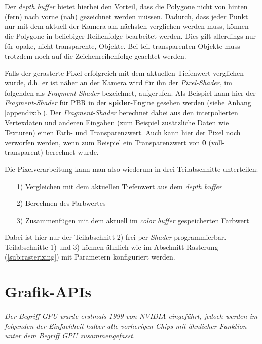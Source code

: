 \documentclass[oneside]{ausarbeitung}
\newcommand*{\quotize}[1]{\glqq #1\grqq}
\begin{document}
Der \textit{depth buffer} bietet hierbei den Vorteil, dass die Polygone nicht von \quotize{hinten (fern) nach vorne (nah)} gezeichnet werden müssen. Dadurch, dass jeder Punkt nur mit dem aktuell der Kamera am nächsten verglichen werden muss, können die Polygone in beliebiger Reihenfolge bearbeitet werden. Dies gilt allerdings nur für opake, nicht transparente, Objekte. Bei teil-transparenten Objekte muss trotzdem noch auf die Zeichenreihenfolge geachtet werden.

Falls der gerasterte Pixel erfolgreich mit dem aktuellen Tiefenwert verglichen wurde, d.h. er ist näher an der Kamera wird für ihn der \textit{Pixel-Shader}, im folgenden als \textit{Fragment-Shader} bezeichnet, aufgerufen. Als Beispiel kann hier der \textit{Fragment-Shader} für \ac{PBR} in der \textbf{spider}-Engine gesehen werden (siehe Anhang \ref{appendix:b}). Der  \textit{Fragment-Shader} berechnet dabei aus den interpolierten Vertexdaten und anderen Eingaben (zum Beispiel zusätzliche Daten wie Texturen) einen Farb- und Transparenzwert. Auch kann hier der Pixel noch verworfen werden, wenn zum Beispiel ein Transparenzwert von \textbf{0} (voll-transparent) berechnet wurde.

Die Pixelverarbeitung kann man also wiederum in drei Teilabschnitte unterteilen: 
\begin{itemize}
\item[1)]{Vergleichen mit dem aktuellen Tiefenwert aus dem \textit{depth buffer}}
\item[2)]{Berechnen des Farbwertes}
\item[3)]{Zusammenfügen mit dem aktuell im \textit{color buffer} gespeicherten Farbwert}
\end{itemize} 
Dabei ist hier nur der Teilabschnitt 2) frei per \textit{Shader} programmierbar. Teilabschnitte 1) und 3) können ähnlich wie im Abschnitt Rasterung (\ref{sub:rasterizing}) mit Parametern konfiguriert werden.

\section{Grafik-APIs \cite[Vgl.][The Evolution of Programmable Shading and APIs]{real_time_rendering}}
\textit{Der Begriff \quotize{\ac{GPU}} wurde erstmals 1999 von NVIDIA eingeführt, jedoch werden im folgenden der Einfachheit halber alle vorherigen Chips mit ähnlicher Funktion unter dem Begriff \quotize{\ac{GPU}} zusammengefasst.}
\end{document}

